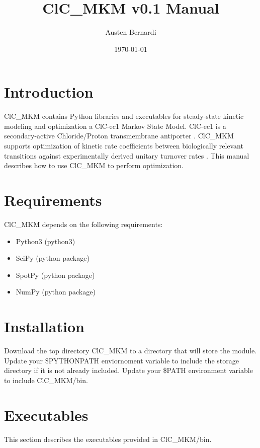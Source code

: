 \documentclass[12pt]{article}
\title{ClC\_MKM v0.1 Manual}
\author{Austen Bernardi}
\date{\today}
\newcommand{\parameters}[1]{{\fontfamily{pcr}\selectfont#1}}
\begin{document}
\maketitle{}

\tableofcontents
\clearpage
\newpage

\section{Introduction}

ClC\_MKM contains Python libraries and executables for steady-state kinetic modeling and optimization a ClC-ec1 Markov State Model. ClC-ec1 is a secondary-active Chloride/Proton transmembrane antiporter \cite{mayes2018multiscale}. ClC\_MKM supports optimization of kinetic rate coefficients between biologically relevant transitions against experimentally derived unitary turnover rates \cite{lim2009intracellular}. This manual describes how to use ClC\_MKM to perform optimization.

\section{Requirements}
ClC\_MKM depends on the following requirements:

\begin{itemize}
\item Python3 (python3)
\item SciPy (python package)
\item SpotPy (python package)
\item NumPy (python package)
\end{itemize}

\section{Installation}
Download the top directory \parameters{ClC\_MKM} to a directory that will store the module. Update your \parameters{\$PYTHONPATH} enviornoment variable to include the storage directory if it is not already included. Update your \parameters{\$PATH} environment variable to include \parameters{ClC\_MKM/bin}.

\clearpage
\section{Executables}
\label{sec:exec}

This section describes the executables provided in \parameters{ClC\_MKM/bin}.
\end{document}
